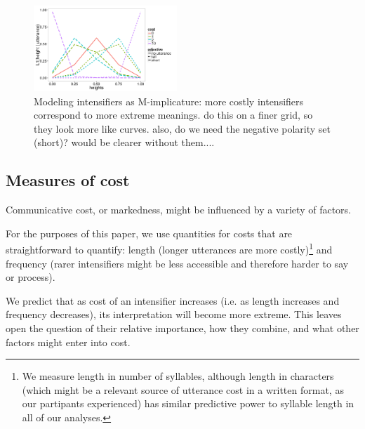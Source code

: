 \documentclass[10pt,letterpaper]{article}
\newcommand{\todo}[1]{{\color{red}#1}}
\begin{document}
\begin{figure}[ht]
\begin{center}
\includegraphics[width=0.48\textwidth]{analysis_files_for_writeup/images/model_results.png}
\end{center}
\caption{Modeling intensifiers as M-implicature: more costly intensifiers correspond to more extreme meanings. \todo{do this on a finer grid, so they look more like curves. also, do we need the negative polarity set (short)? would be clearer without them....} } 
\label{model}
\end{figure}


\subsection{Measures of cost}


Communicative cost, or markedness,
might be influenced by a variety of factors.

For the purposes of this paper, we use quantities for costs that are straightforward to quantify: length (longer utterances are more costly)\footnote{We measure length in number of syllables, although length in characters (which might be a relevant source of utterance cost in a written format, as our partipants experienced) has similar
predictive power to syllable length in all of our analyses.}
and frequency (rarer intensifiers might be less accessible and therefore harder to say or process).

We predict that as cost of an intensifier increases (i.e. as length increases and frequency decreases), its interpretation will become more extreme. This leaves open the question of their relative importance,
how they combine,
and what other factors %
might enter into cost.
\end{document}
